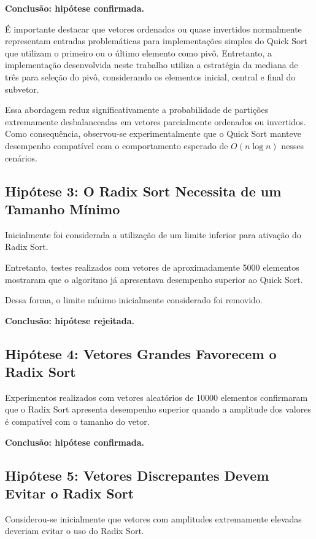 \documentclass{article}
\begin{document}
\textbf{Conclusão: hipótese confirmada.}

É importante destacar que vetores ordenados ou quase invertidos normalmente representam entradas problemáticas para implementações simples do Quick Sort que utilizam o primeiro ou o último elemento como pivô. Entretanto, a implementação desenvolvida neste trabalho utiliza a estratégia da mediana de três para seleção do pivô, considerando os elementos inicial, central e final do subvetor.

Essa abordagem reduz significativamente a probabilidade de partições extremamente desbalanceadas em vetores parcialmente ordenados ou invertidos. Como consequência, observou-se experimentalmente que o Quick Sort manteve desempenho compatível com o comportamento esperado de \(O(n \log n)\) nesses cenários.

\subsection{Hipótese 3: O Radix Sort Necessita de um Tamanho Mínimo}

Inicialmente foi considerada a utilização de um limite inferior para ativação do Radix Sort.

Entretanto, testes realizados com vetores de aproximadamente 5000 elementos mostraram que o algoritmo já apresentava desempenho superior ao Quick Sort.

Dessa forma, o limite mínimo inicialmente considerado foi removido.

\textbf{Conclusão: hipótese rejeitada.}

\subsection{Hipótese 4: Vetores Grandes Favorecem o Radix Sort}

Experimentos realizados com vetores aleatórios de 10000 elementos confirmaram que o Radix Sort apresenta desempenho superior quando a amplitude dos valores é compatível com o tamanho do vetor.

\textbf{Conclusão: hipótese confirmada.}

\subsection{Hipótese 5: Vetores Discrepantes Devem Evitar o Radix Sort}

Considerou-se inicialmente que vetores com amplitudes extremamente elevadas deveriam evitar o uso do Radix Sort.
\end{document}
